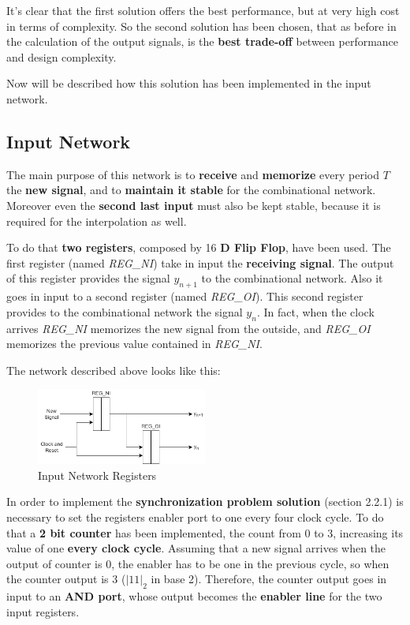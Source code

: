 It's clear that the first solution offers the best performance, but at very high cost in terms of complexity. So the second solution has been chosen, that as before in the calculation of the output signals, is the \textbf{best trade-off} between performance and design complexity.

Now will be described how this solution has been implemented in the input network.

\subsection{Input Network}

The main purpose of this network is to \textbf{receive} and \textbf{memorize} every period $T$ the \textbf{new signal}, and to \textbf{maintain it stable} for the combinational network. Moreover even the \textbf{second last input} must also be kept stable, because it is required for the interpolation as well.

To do that \textbf{two registers}, composed by 16 \textbf{D Flip Flop}, have been used. The first register (named \textit{REG\_NI}) take in input the \textbf{receiving signal}. The output of this register provides the signal $y_{n+1}$ to the combinational network. Also it goes in input to a second register (named \textit{REG\_OI}). This second register provides to the combinational network the signal $y_n$. In fact, when the clock arrives \textit{REG\_NI} memorizes the new signal from the outside, and \textit{REG\_OI} memorizes the previous value contained in \textit{REG\_NI}.

The network described above looks like this:

\begin{figure}[H]
    \centering
    \includegraphics[width=0.5\textwidth]{img/Chapter2/InputNetwork1.png}
    \caption{Input Network Registers}
    \label{fig:InputNetwork1}
\end{figure}

In order to implement the \textbf{synchronization problem solution} (section 2.2.1) is necessary to set the registers enabler port to one every four clock cycle. To do that a \textbf{2 bit counter} has been implemented, the count from 0 to 3, increasing its value of one \textbf{every clock cycle}. Assuming that a new signal arrives when the output of counter is 0, the enabler has to be one in the previous cycle, so when the counter output is 3 ($|11|_2$ in base 2). Therefore, the counter output goes in input to an \textbf{AND port}, whose output becomes the \textbf{enabler line} for the two input registers.

